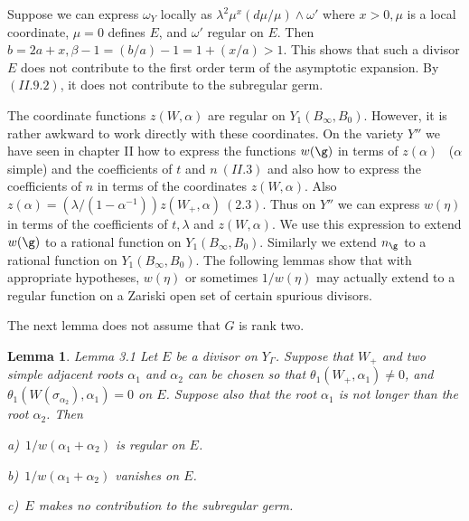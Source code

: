 \documentclass{memo-l}
\newtheorem{lemma}[theorem]{Lemma}
\theoremstyle{definition}
\theoremstyle{remark}
\numberwithin{section}{chapter}
\numberwithin{equation}{chapter}
\begin{document}
 Suppose we can express ${\omega}_{Y}$ locally as ${\lambda}^{2}{\mu}^{x}
 (d{\mu}/{\mu}) \wedge {\omega}'$ where $x>0, {\mu}$ is a local coordinate, 
${\mu}=0$ defines $E$, and ${\omega}'$ regular on $E$. 
 Then $b=2a+x, {\beta}-1 = (b/a)-1 = 1 + (x/a) > 1$. 
 This shows that such a divisor $E$ does not contribute to the first order 
term of the asymptotic expansion. 
 By $(II.9.2)$, it does not contribute to the subregular germ.

   The coordinate functions $z(W,{\alpha})$ are regular on $Y_{1}(B_{{\infty}},
B_{0})$. 
 However, it is rather awkward to work directly with these coordinates. 
 On the variety $Y''$ we have seen in chapter II how to express the functions 
$w({\g})$ in terms of $z({\alpha})$ \ (${\alpha}$ simple) and the coefficients 
of $t$ and $n \ (II.3)$ and also how to express the coefficients of $n$ in terms 
of the coordinates $z(W,{\alpha})$. 
 Also $z({\alpha}) = ({\lambda}/(1-{\alpha}^{-1}))z(W_{+},{\alpha}) \
 (2.3)$. 
 Thus on $Y''$ we can express $w({\eta})$ in terms of the coefficients of $t, 
{\lambda}$ and $z(W,{\alpha})$. 
 We use this expression to extend $w({\g})$ to a rational function on 
$Y_{1}(B_{{\infty}},B_{0})$. 
 Similarly we extend $n_{{\g}}$ to a rational function on 
$Y_{1}(B_{{\infty}},B_{0})$. 
 The following lemmas show that with appropriate hypotheses, $w({\eta})$ or 
sometimes $1/w({\eta})$ may actually extend to a regular function on a Zariski 
open set of certain spurious divisors. 

   The next lemma does not assume that $G$ is rank two.

\medpagebreak

\begin{lemma}{Lemma 3.1}   Let $E$ be a divisor on $Y_{{\Gamma}}$. 
 Suppose that $W_{+}$ and two simple adjacent roots ${\alpha}_{1}$ and 
${\alpha}_{2}$ can be chosen so that ${\theta}_{1}(W_{+},{\alpha}_{1})\ne 0$, 
and ${\theta}_{1}(W({\sigma}_{\alpha_2}),{\alpha}_{1}) = 0$ on $E$. 
 Suppose also that the root ${\alpha}_{1}$ is not longer than the root 
${\alpha}_{2}$. 
 Then

\noindent
a)\   $1/w({\alpha}_{1}+{\alpha}_{2})$ is regular on $E$.

\noindent
b)\   $1/w({\alpha}_{1}+{\alpha}_{2})$ vanishes on $E$.

\noindent
c)\    $E$ makes no contribution to the subregular germ.
\end{lemma}

\medpagebreak
\end{document}
